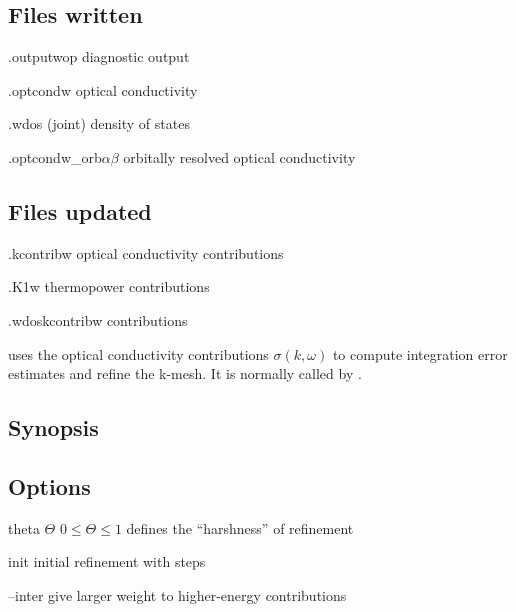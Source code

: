 \subsection{Files written}
\begin{options}
\item[\case.outputwop] diagnostic output 
\item[\case.optcondw] optical conductivity 
\item[\case.wdos] (joint) density of states 
\item[\case.optcondw\_orb$αβ$] orbitally resolved optical conductivity
\end{options}

\subsection{Files updated}
\begin{options}
\item[\case.kcontribw] optical conductivity contributions
\item[\case.K1w] thermopower contributions
\item[\case.wdoskcontribw] \dos contributions
\end{options}



 uses the optical conductivity contributions $σ(k, ω)$ to
compute integration error estimates and refine the k-mesh.  It is
normally called by \woprog.

\subsection{Synopsis}
\begin{usage}
   \case
\end{usage}

\subsection{Options}
\begin{options}
\item[\td theta $Θ$] $0 \le Θ \le 1$ defines the ``harshness'' of
  refinement 
\item[\td init \NI] initial refinement with \NI steps 
\item[--inter] give larger weight to higher-energy contributions
\end{options}

